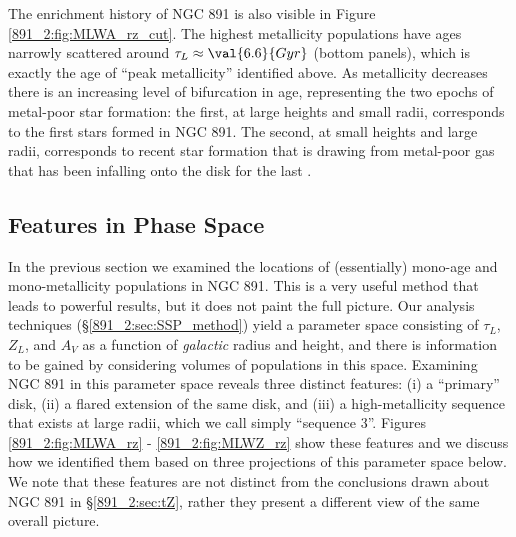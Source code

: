 The enrichment history of NGC 891 is also visible in Figure
\ref{891_2:fig:MLWA_rz_cut}. The highest metallicity populations have
ages narrowly scattered around $\tau_L \approx \val{6.6}{Gyr}$ (bottom
panels), which is exactly the age of ``peak metallicity'' identified
above. As metallicity decreases there is an increasing level of
bifurcation in age, representing the two epochs of metal-poor star
formation: the first, at large heights and small radii, corresponds to
the first stars formed in NGC 891. The second, at small heights and
large radii, corresponds to recent star formation that is drawing from
metal-poor gas that has been infalling onto the disk for the last
.

\subsection{Features in Phase Space}
\label{891_2:sec:rz}

In the previous section we examined the locations of (essentially)
mono-age and mono-metallicity populations in NGC 891. This is a very
useful method that leads to powerful results, but it does not paint
the full picture.  Our analysis techniques
(\S\ref{891_2:sec:SSP_method}) yield a parameter space consisting of
$\tau_L$, $Z_L$, and $A_V$ as a function of \emph{galactic} radius and
height, and there is information to be gained by considering volumes
of populations in this space. Examining NGC 891 in this parameter
space reveals three distinct features: (i) a ``primary'' disk, (ii) a
flared extension of the same disk, and (iii) a high-metallicity
sequence that exists at large radii, which we call simply ``sequence
3''. Figures \ref{891_2:fig:MLWA_rz} - \ref{891_2:fig:MLWZ_rz} show
these features and we discuss how we identified them based on three
projections of this parameter space below. We note that these features
are not distinct from the conclusions drawn about NGC 891 in
\S\ref{891_2:sec:tZ}, rather they present a different view of the same
overall picture.



